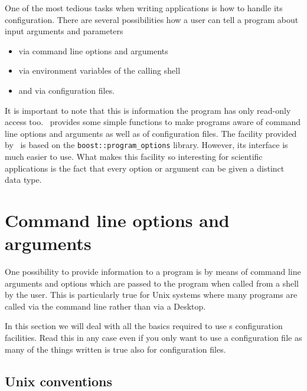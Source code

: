
One of the most tedious tasks when writing applications is how to handle its
configuration. There are several possibilities how a user can tell a program
about input arguments and parameters 
\begin{itemize}
\item via command line options and arguments
\item via environment variables of the calling shell
\item and via configuration files.
\end{itemize}
It is important to note that this is information the program has only read-only
access too. \libpnicore\ provides some simple functions to make programs aware
of command line options and arguments as well as of configuration files. The
facility provided by \libpnicore\ is based on the \texttt{boost::program\_options}
library. However, its interface is much easier to use.  
What makes this facility so interesting for scientific applications is the fact
that every option or argument can be given a distinct data type. 

\section{Command line options and arguments}

One possibility to provide information to a program is by means of command line
arguments and options which are passed to the program when called from a shell
by the user. This is particularly true for Unix systems where many programs are
called via the command line rather than via a Desktop. 

In this section we will deal with all the basics required to use \libpnicore s
configuration facilities. Read this in any case even if you only want to use a
configuration file as many of the things written is true also for configuration
files. 

\subsection{Unix conventions}


